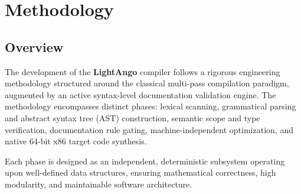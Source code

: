 \chapter{Methodology}\doublespacing

\section{Overview}
The development of the \textbf{LightAngo} compiler follows a rigorous engineering methodology structured around the classical multi-pass compilation paradigm, augmented by an active syntax-level documentation validation engine. The methodology encompasses distinct phases: lexical scanning, grammatical parsing and abstract syntax tree (AST) construction, semantic scope and type verification, documentation rule gating, machine-independent optimization, and native 64-bit x86 target code synthesis.

Each phase is designed as an independent, deterministic subsystem operating upon well-defined data structures, ensuring mathematical correctness, high modularity, and maintainable software architecture.


